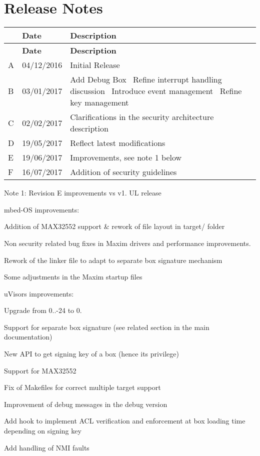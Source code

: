 \hypertarget{_r_e_l_e_a_s_e__n_o_t_e_s_rn}{}\section{Release Notes}\label{_r_e_l_e_a_s_e__n_o_t_e_s_rn}
\tabulinesep=1mm
\begin{longtabu} spread 0pt [c]{*{3}{|X[-1]}|}
\hline
{}&{\bf Date }&{\bf Description  }\\
\endfirsthead
\hline
\endfoot
\hline
{}&{\bf Date }&{\bf Description  }\\
\endhead
A &04/12/2016 &Initial Release \\
B &03/01/2017 &Add Debug Box~\newline
Refine interrupt handling discussion~\newline
Introduce event management~\newline
 Refine key management \\
C &02/02/2017 &Clarifications in the security architecture description \\
D &19/05/2017 &Reflect latest modifications \\
E &19/06/2017 &Improvements, see note 1 below \\
F &16/07/2017 &Addition of security guidelines \\
\end{longtabu}


Note 1\+: Revision E improvements vs v1. UL release

mbed-\/\+OS improvements\+:
\begin{DoxyItemize}
\item Addition of M\+A\+X32552 support \& rework of file layout in target/ folder
\item Non security related bug fixes in Maxim drivers and performance improvements.
\item Rework of the linker file to adapt to separate box signature mechanism
\item Some adjustments in the Maxim startup files
\end{DoxyItemize}

u\+Visor\textquotesingle{}s improvements\+:
\begin{DoxyItemize}
\item Upgrade from 0..-\/24 to 0.
\item Support for separate box signature (see related section in the main documentation)
\item New A\+PI to get signing key of a box (hence it\textquotesingle{}s privilege)
\item Support for M\+A\+X32552
\item Fix of Makefiles for correct multiple target support
\item Improvement of debug messages in the debug version
\item Add hook to implement A\+CL verification and enforcement at box loading time depending on signing key
\item Add handling of N\+MI faults
\end{DoxyItemize}

